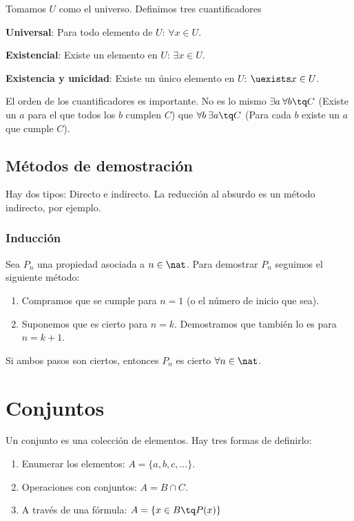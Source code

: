 \documentclass[nochap]{apuntes}
\begin{document}
Tomamos $U$ como el universo. Definimos tres cuantificadores

\textbf{Universal}: Para todo elemento de $U$: $\forall x \in U$.

\textbf{Existencial}: Existe un elemento en $U$: $\exists x \in U$.

\textbf{Existencia y unicidad}: Existe un único elemento en $U$: $\uexists x \in U$.

\begin{remark}
El orden de los cuantificadores es importante. No es lo mismo $\exists a\: \forall b \tq C$ (Existe un $a$ para el que todos los $b$ cumplen $C$) que $\forall b\: \exists a \tq C$ (Para cada $b$ existe un $a$ que cumple $C$).
\end{remark}
\subsection{Métodos de demostración}

Hay dos tipos: Directo e indirecto. La reducción al absurdo es un método indirecto, por ejemplo.

\subsubsection{Inducción}

Sea $P_n$ una propiedad asociada a $n \in \nat$. Para demostrar $P_n$ seguimos el siguiente método:
\begin{enumerate}
\item Compramos que se cumple para $n=1$ (o el número de inicio que sea).
\item Suponemos que es cierto para $n=k$. Demostramos que también lo es para $n=k+1$.
\end{enumerate}

Si ambos pasos son ciertos, entonces $P_n$ es cierto $\forall n \in \nat$.


\section{Conjuntos}

Un conjunto es una colección de elementos. Hay tres formas de definirlo:

\begin{enumerate}
\item Enumerar los elementos: $A=\{a,b,c,...\}$.
\item Operaciones con conjuntos: $A=B\cap C$.
\item A través de una fórmula: $A=\{x\in B \tq P(x)\}$
\end{enumerate}
\end{document}
